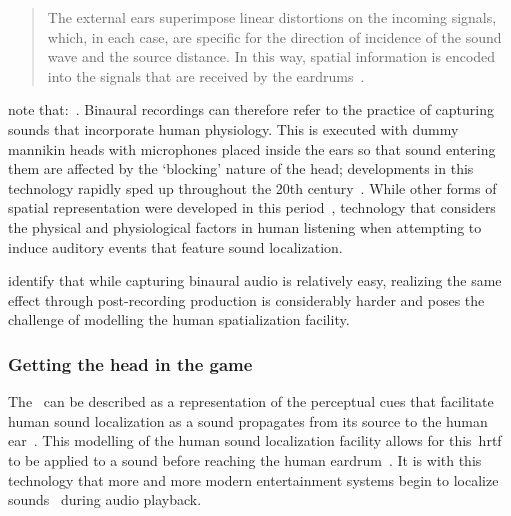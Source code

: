 \begin{quotation}
    The external ears superimpose linear distortions on the incoming signals, which, in each case, are specific for the direction of incidence of the sound wave and the source distance.
    In this way, spatial information is encoded into the signals that are received by the eardrums~\citep{blauert_spatial}.
\end{quotation}

\citet{roginska2017immersive} note that:~.
Binaural recordings can therefore refer to the practice of capturing sounds that incorporate human physiology.
This is executed with dummy mannikin heads with microphones placed inside the ears so that sound entering them are affected by the `blocking' nature of the head;
developments in this technology rapidly sped up throughout the 20th century~\citep{binaural_paul}.
While other forms of spatial representation were developed in this period~\citep{gerzon_periphony, noisternig_ambisonic, wave_field}, technology that considers the physical and physiological factors in human listening when attempting to induce auditory events that feature sound localization.

\citet{roginska2017immersive} identify that while capturing binaural audio is relatively easy, realizing the same effect through post-recording production is considerably harder and poses the challenge of modelling the human spatialization facility.

\subsubsection{Getting the head in the game}

The~ can be described as a representation of the perceptual cues that facilitate human sound localization as a sound propagates from its source to the human ear~\citep{Suzuki2011}.
This modelling of the human sound localization facility allows for this~\gls{hrtf} to be applied to a sound before reaching the human eardrum~\citep{roginska2017immersive}.
It is with this technology that more and more modern entertainment systems begin to localize sounds~\citep{blauert_spatial, HONDA2007, roginska2017immersive, Suzuki2011, Xie2013, ps5_audio, soundscape_design} during audio playback.

